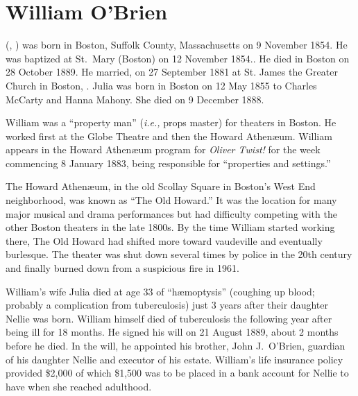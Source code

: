 \section{William O'Brien}

 (, ) was born in Boston, Suffolk County, Massachusetts on 9 November 1854.\cite{William3OBrienBirth} He was baptized at St.\ Mary (Boston) on 12 November 1854.\cite{William3OBrienBaptism}. He died in Boston on 28 October 1889.\cite{William3OBrienDeath} He married, on 27 September 1881 at St. James the Greater Church in Boston, .\cite{William3OBrienMarriage} Julia was born in Boston on 12 May 1855 to Charles McCarty and Hanna Mahony.\cite{JuliaMcCartyBaptism} She died on 9 December 1888.\cite{JuliaMcCartyDeath}

William was a ``property man'' (\textit{i.e.,} props master\cite{PropertyMan}) for theaters in Boston. He worked first at the Globe Theatre\cite{WilliamOBrien1880} and then the Howard Athen\ae um.\cite{WilliamOBrien1883} William appears in the Howard Athen\ae um program for \textit{Oliver Twist!} for the week commencing 8 January 1883, being responsible for ``properties and settings.''\cite{William3OBrienProgram} 

The Howard Athen\ae um, in the old Scollay Square in Boston's West End neighborhood, was known as ``The Old Howard.'' It was the location for many major musical and drama performances but had difficulty competing with the other Boston theaters in the late 1800s. By the time William started working there, The Old Howard had shifted more toward vaudeville and eventually burlesque. The theater was shut down several times by police in the 20th century and finally burned down from a suspicious fire in 1961.\cite{HowardAthenaeum}

William's wife Julia died at age 33 of ``h\ae moptysis'' (coughing up blood; probably a complication from tuberculosis) just 3 years after their daughter Nellie was born.\cite{JuliaMcCartyDeath} William himself died of tuberculosis the following year after being ill for 18 months.\cite{William3OBrienDeath} He signed his will on 21 August 1889, about 2 months before he died. In the will, he appointed his brother, John J.\ O'Brien, guardian of his daughter Nellie and executor of his estate. William's life insurance policy provided \$2,000 of which \$1,500 was to be placed in a bank account for Nellie to have when she reached adulthood.\cite{WilliamOBrienWill}

